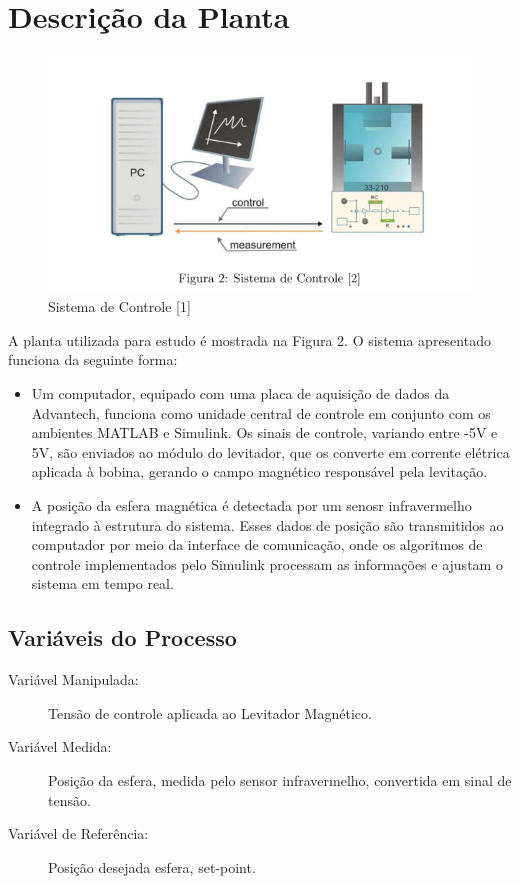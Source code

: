 \section{Descrição da Planta}
\begin{figure}
    \centering 
    \includegraphics[width=\linewidth]{control.png}
    \caption{ Sistema de Controle [1]}
    \label{fig:2}
\end{figure}
A planta utilizada para estudo é mostrada na Figura 2. O sistema apresentado funciona da seguinte forma:

\begin{itemize}
    \item Um computador, equipado com uma placa de aquisição de dados da Advantech, funciona como unidade central de controle em conjunto com os ambientes MATLAB e Simulink. Os sinais de controle, variando entre -5V e 5V, são enviados ao módulo do levitador, que os converte em corrente elétrica aplicada à bobina, gerando o campo magnético responsável pela levitação.
    \item A posição da esfera magnética é detectada por um senosr infravermelho integrado à estrutura do sistema. Esses dados de posição são transmitidos ao computador por meio da interface de comunicação, onde os algoritmos de controle implementados pelo Simulink processam as informações e ajustam o sistema em tempo real.
\end{itemize}

\subsection{Variáveis do Processo}
\begin{description}
    \item[Variável Manipulada:] Tensão de controle aplicada ao Levitador Magnético.
    \item[Variável Medida:] Posição da esfera, medida pelo sensor infravermelho, convertida em sinal de tensão.
    \item[Variável de Referência:] Posição desejada esfera, set-point. 
\end{description}


